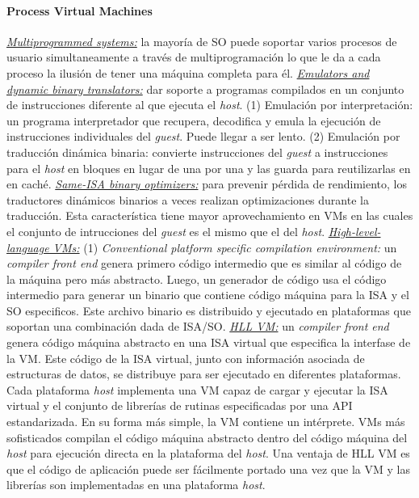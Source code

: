 \paragraph{\textnormal{\textbf{Process Virtual Machines}}}
\underline{\textit{Multiprogrammed systems:}} la mayoría de SO puede soportar varios procesos de usuario simultaneamente a través de multiprogramación lo que le da a cada proceso la ilusión de tener una máquina completa para él. \underline{\textit{Emulators and dynamic binary translators:}} dar soporte a programas compilados en un conjunto de instrucciones diferente al que ejecuta el \emph{host}. (1) Emulación por interpretación: un programa interpretador que recupera, decodifica y emula la ejecución de instrucciones individuales del \emph{guest}. Puede llegar a ser lento. (2) Emulación por traducción dinámica binaria: convierte instrucciones del \emph{guest} a instrucciones para el \emph{host} en bloques en lugar de una por una y las guarda para reutilizarlas en en caché. \underline{\textit{Same-ISA binary optimizers:}} para prevenir pérdida de rendimiento, los traductores dinámicos binarios a veces realizan optimizaciones durante la traducción. Esta característica tiene mayor aprovechamiento en VMs en las cuales el conjunto de intrucciones del \emph{guest} es el mismo que el del \emph{host}. \underline{\textit{High-level-language VMs:}} (1) \emph{Conventional platform specific compilation environment:} un \emph{compiler front end} genera primero código intermedio que es similar al código de la máquina pero más abstracto. Luego, un generador de código usa el código intermedio para generar un binario que contiene código máquina para la ISA y el SO especificos. Este archivo binario es distribuido y ejecutado en plataformas que soportan una combinación dada de ISA/SO. \underline{\textit{HLL VM:}} un \emph{compiler front end} genera código máquina abstracto en una ISA virtual que especifica la interfase de la VM. Este código de la ISA virtual, junto con información asociada de estructuras de datos, se distribuye para ser ejecutado en diferentes plataformas. Cada plataforma \emph{host} implementa una VM capaz de cargar y ejecutar la ISA virtual y el conjunto de librerías de rutinas especificadas por una API estandarizada. En su forma más simple, la VM contiene un intérprete. VMs más sofisticados compilan el código máquina abstracto dentro del código máquina del \emph{host} para ejecución directa en la plataforma del \emph{host}. Una ventaja de HLL VM es que el código de aplicación puede ser fácilmente portado una vez que la VM y las librerías son implementadas en una plataforma \emph{host}.

